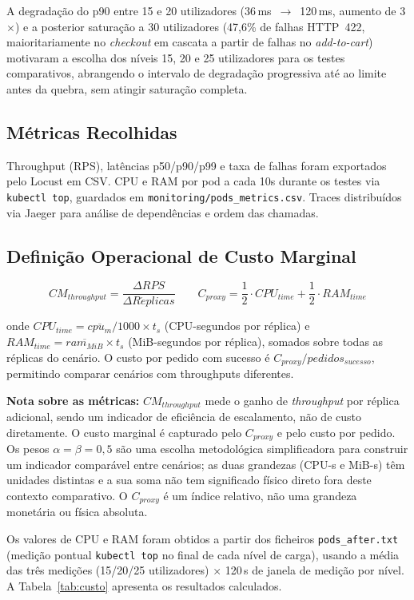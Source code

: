 \documentclass[manuscript,oneside]{acmart}
\begin{document}
A degradação do p90 entre 15 e 20 utilizadores (36\,ms~$\rightarrow$~120\,ms, aumento de 3$\times$) e a posterior saturação a 30 utilizadores (47{,}6\% de falhas HTTP~422, maioritariamente no \textit{checkout} em cascata a partir de falhas no \textit{add-to-cart}) motivaram a escolha dos níveis 15, 20 e 25 utilizadores para os testes comparativos, abrangendo o intervalo de degradação progressiva até ao limite antes da quebra, sem atingir saturação completa.

\subsection{Métricas Recolhidas}

Throughput (RPS), latências p50/p90/p99 e taxa de falhas foram exportados pelo Locust em CSV. CPU e RAM por pod a cada 10s durante os testes via \texttt{kubectl top}, guardados em \texttt{monitoring/pods\_metrics.csv}. Traces distribuídos via Jaeger para análise de dependências e ordem das chamadas.

\subsection{Definição Operacional de Custo Marginal}

\[
CM_{throughput} = \frac{\Delta RPS}{\Delta R\acute{e}plicas}
\qquad
C_{proxy} = \frac{1}{2} \cdot CPU_{time} + \frac{1}{2} \cdot RAM_{time}
\]

onde $CPU_{time} = \overline{cpu_{m}} / 1000 \times t_{s}$ (CPU-segundos por réplica) e $RAM_{time} = \overline{ram_{MiB}} \times t_{s}$ (MiB-segundos por réplica), somados sobre todas as réplicas do cenário. O custo por pedido com sucesso é $C_{proxy} / pedidos_{sucesso}$, permitindo comparar cenários com throughputs diferentes.

\textbf{Nota sobre as métricas:} $CM_{throughput}$ mede o ganho de \textit{throughput} por réplica adicional, sendo um indicador de eficiência de escalamento, não de custo diretamente. O custo marginal é capturado pelo $C_{proxy}$ e pelo custo por pedido. Os pesos $\alpha = \beta = 0{,}5$ são uma escolha metodológica simplificadora para construir um indicador comparável entre cenários; as duas grandezas (CPU-s e MiB-s) têm unidades distintas e a sua soma não tem significado físico direto fora deste contexto comparativo. O $C_{proxy}$ é um índice relativo, não uma grandeza monetária ou física absoluta.

Os valores de CPU e RAM foram obtidos a partir dos ficheiros \texttt{pods\_after.txt} (medição pontual \texttt{kubectl top} no final de cada nível de carga), usando a média das três medições (15/20/25 utilizadores) × 120\,s de janela de medição por nível. A Tabela~\ref{tab:custo} apresenta os resultados calculados.
\end{document}
